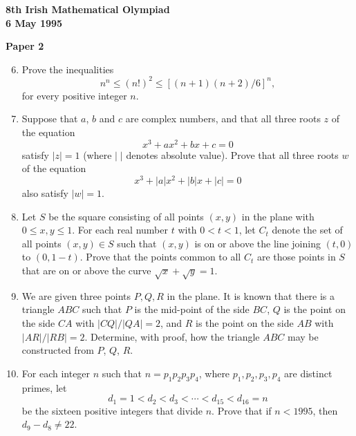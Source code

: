 \documentclass[12pt]{article}
\begin{document}
\newpage
\begin{center}
{\large\bfseries 8th Irish Mathematical Olympiad\\6 May 1995}
\end{center}
\bigskip\noindent\textbf{Paper 2}\bigskip
\begin{enumerate}
\setcounter{enumi}{5}
\item Prove the inequalities
\[n^n \le (n!)^2 \le [(n+1)(n+2)/6]^n,\]
for every positive integer $n$.

\item Suppose that $a$, $b$ and $c$ are complex numbers, and that all three roots $z$ of the equation
\[x^3 + ax^2 + bx + c = 0\]
satisfy $|z| = 1$ (where $|\;|$ denotes absolute value). Prove that all three roots $w$ of the equation
\[x^3 + |a|x^2 + |b|x + |c| = 0\]
also satisfy $|w| = 1$.

\item Let $S$ be the square consisting of all points $(x,y)$ in the plane with $0 \le x, y \le 1$. For each real number $t$ with $0 < t < 1$, let $C_t$ denote the set of all points $(x,y) \in S$ such that $(x,y)$ is on or above the line joining $(t,0)$ to $(0, 1-t)$.
Prove that the points common to all $C_t$ are those points in $S$ that are on or above the curve $\sqrt{x} + \sqrt{y} = 1$.

\item We are given three points $P, Q, R$ in the plane. It is known that there is a triangle $ABC$ such that $P$ is the mid-point of the side $BC$, $Q$ is the point on the side $CA$ with $|CQ|/|QA| = 2$, and $R$ is the point on the side $AB$ with $|AR|/|RB| = 2$. Determine, with proof, how the triangle $ABC$ may be constructed from $P$, $Q$, $R$.

\item For each integer $n$ such that $n = p_1p_2p_3p_4$, where $p_1, p_2, p_3, p_4$ are distinct primes, let
\[d_1 = 1 < d_2 < d_3 < \cdots < d_{15} < d_{16} = n\]
be the sixteen positive integers that divide $n$.
Prove that if $n < 1995$, then $d_9 - d_8 \ne 22$.
\end{enumerate}
\end{document}
